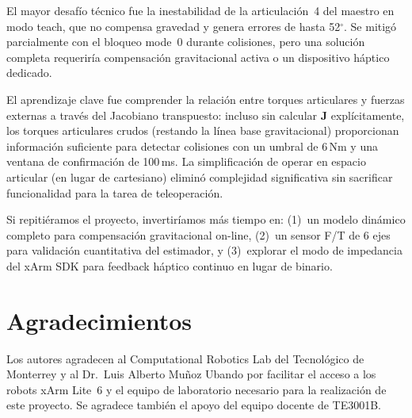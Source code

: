 \documentclass[journal,10pt,twoside]{IEEEtran}
\begin{document}
El mayor desafío técnico fue la inestabilidad de la articulación~4 del
maestro en modo teach, que no compensa gravedad y genera errores de
hasta 52$^\circ$. Se mitigó parcialmente con el bloqueo mode~0 durante
colisiones, pero una solución completa requeriría compensación
gravitacional activa o un dispositivo háptico dedicado.

El aprendizaje clave fue comprender la relación entre torques articulares
y fuerzas externas a través del Jacobiano transpuesto: incluso sin
calcular $\bm{J}$ explícitamente, los torques articulares crudos
(restando la línea base gravitacional) proporcionan información
suficiente para detectar colisiones con un umbral de 6\,Nm y una
ventana de confirmación de 100\,ms. La simplificación de operar
en espacio articular (en lugar de cartesiano) eliminó complejidad
significativa sin sacrificar funcionalidad para la tarea de teleoperación.

Si repitiéramos el proyecto, invertiríamos más tiempo en: (1)~un
modelo dinámico completo para compensación gravitacional on-line,
(2)~un sensor F/T de 6 ejes para validación cuantitativa del estimador,
y (3)~explorar el modo de impedancia del xArm SDK para feedback
háptico continuo en lugar de binario.

\section*{Agradecimientos}

Los autores agradecen al Computational Robotics Lab del Tecnológico
de Monterrey y al Dr.\ Luis Alberto Muñoz Ubando por facilitar el
acceso a los robots xArm Lite~6 y el equipo de laboratorio necesario
para la realización de este proyecto. Se agradece también el apoyo
del equipo docente de TE3001B.
\end{document}
